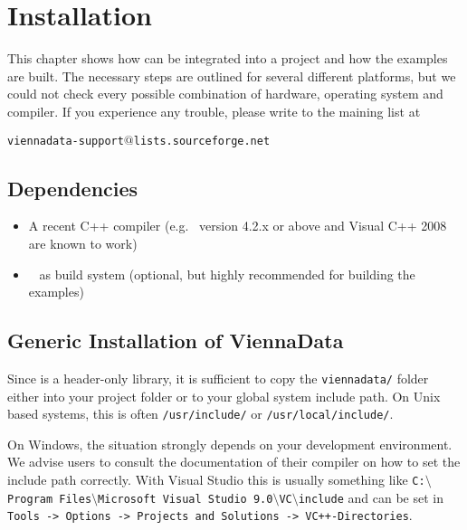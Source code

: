 \chapter{Installation}

This chapter shows how {\ViennaData} can be integrated into a project and how
the examples are built. The necessary steps are outlined for several different
platforms, but we could not check every possible combination of hardware,
operating system and compiler. If you experience any trouble, please write to
the maining list at \\
\begin{center}
\texttt{viennadata-support$@$lists.sourceforge.net} 
\end{center}


\section{Dependencies}
\label{dependencies}

\begin{itemize}
 \item A recent C++ compiler (e.g.~{\GCC} version 4.2.x or above and Visual C++
2008 are known to work)
 \item {\CMake}~\cite{cmake} as build system (optional, but highly recommended
for building the examples)
\end{itemize}


\section{Generic Installation of ViennaData} \label{sec:viennacl-installation}
Since {\ViennaData} is a header-only library, it is sufficient to copy the 
\lstinline|viennadata/| folder either into your project folder or to your global system
include path. On Unix based systems, this is often \lstinline|/usr/include/| or
\lstinline|/usr/local/include/|.

On Windows, the situation strongly depends on your development environment. We
advise users
to consult the documentation of their compiler on how to set the include
path correctly. With Visual Studio this is usually something like
\texttt{C:$\setminus$Program Files$\setminus$Microsoft Visual Studio
9.0$\setminus$VC$\setminus$include}
and can be set in \texttt{Tools -> Options -> Projects and Solutions ->
VC++-\-Directories}. 


